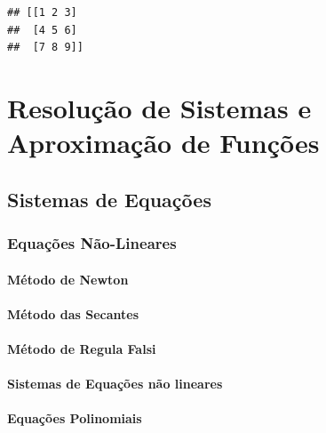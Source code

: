\documentclass[
]{book}
\begin{document}
\begin{verbatim}
## [[1 2 3]
##  [4 5 6]
##  [7 8 9]]
\end{verbatim}

\hypertarget{part-resoluuxe7uxe3o-de-sistemas-e-aproximauxe7uxe3o-de-funuxe7uxf5es}{%
\part{Resolução de Sistemas e Aproximação de Funções}\label{part-resoluuxe7uxe3o-de-sistemas-e-aproximauxe7uxe3o-de-funuxe7uxf5es}}

\hypertarget{sistemas-de-equauxe7uxf5es}{%
\chapter{Sistemas de Equações}\label{sistemas-de-equauxe7uxf5es}}

\hypertarget{equauxe7uxf5es-nuxe3o-lineares}{%
\section{Equações Não-Lineares}\label{equauxe7uxf5es-nuxe3o-lineares}}

\hypertarget{muxe9todo-de-newton}{%
\subsection{Método de Newton}\label{muxe9todo-de-newton}}

\hypertarget{muxe9todo-das-secantes}{%
\subsection{Método das Secantes}\label{muxe9todo-das-secantes}}

\hypertarget{muxe9todo-de-regula-falsi}{%
\subsection{Método de Regula Falsi}\label{muxe9todo-de-regula-falsi}}

\hypertarget{sistemas-de-equauxe7uxf5es-nuxe3o-lineares}{%
\subsection{Sistemas de Equações não lineares}\label{sistemas-de-equauxe7uxf5es-nuxe3o-lineares}}

\hypertarget{equauxe7uxf5es-polinomiais}{%
\subsection{Equações Polinomiais}\label{equauxe7uxf5es-polinomiais}}
\end{document}
